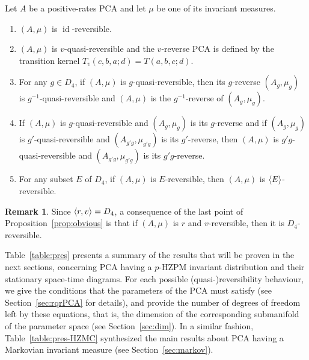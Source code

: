 \documentclass[10pt]{amsart}
\theoremstyle{definition}\newtheorem{defi}[theo]{Definition}\newtheorem{rema}[theo]{Remark}\newtheorem{exam}[theo]{Example}\newtheorem{exem}[theo]{Example}\newtheorem{nota}[theo]{Notation}
\DeclarePairedDelimiter{\vect}{\langle}{\rangle}
\newcounter{a}
\DeclareMathOperator{\id}{id}
\begin{document}
\begin{prop}\label{prop:obvious}
Let $A$ be a positive-rates PCA and let $\mu$ be one of its invariant measures.
\begin{enumerate}
\item \label{list2.7.1}$(A,\mu)$ is $\id$-reversible.
\item \label{list2.7.2}$(A,\mu)$ is $v$-quasi-reversible and the $v$-reverse PCA is defined by the transition kernel $T_v(c,b,a;d) = T(a,b,c;d)$.
\item \label{list2.7.3}For any $g \in D_4$, if $(A,\mu)$ is $g$-quasi-reversible, then its $g$-reverse $(A_g,\mu_g)$ is $g^{-1}$-quasi-reversible and $(A,\mu)$ is the $g^{-1}$-reverse of $(A_g,\mu_g)$.
\item \label{list2.7.4}If $(A,\mu)$ is $g$-quasi-reversible and $(A_g,\mu_g)$ is its $g$-reverse and if $(A_g,\mu_g)$ is $g'$-quasi-reversible and $(A_{g'g},\mu_{g'g})$ is its $g'$-reverse, then $(A,\mu)$ is $g' g$-quasi-reversible and $(A_{g'g},\mu_{g'g})$ is its $g' g$-reverse.
\item \label{list2.7.5}For any subset $E$ of $D_4$, if $(A,\mu)$ is $E$-reversible, then $(A,\mu)$ is $\vect{E}$-reversible.
\end{enumerate}
\end{prop}

\begin{rema}
Since $\vect{r,v}=D_4$, a consequence of the last point of Proposition~\ref{prop:obvious} is that if $(A,\mu)$ is $r$ and $v$-reversible, then it is $D_4$-reversible.
\end{rema}

Table~\ref{table:pres} presents a summary of the results that will be proven in the next sections, concerning PCA having a $p$-HZPM invariant distribution and their stationary space-time diagrams. For each possible (quasi-)reversibility behaviour, we give the conditions that the parameters of the PCA must satisfy (see Section~\ref{sec:rqrPCA} for details), and provide the number of degrees of freedom left by these equations, that is, the dimension of the corresponding submanifold of the parameter space (see Section~\ref{sec:dim}). In a similar fashion, Table~\ref{table:pres-HZMC} synthesized the main results about PCA having a Markovian invariant measure (see Section~\ref{sec:markov}).
\end{document}
